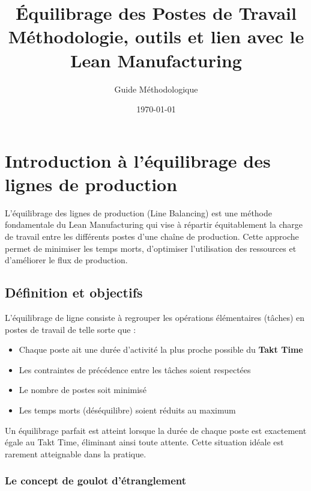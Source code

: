 \documentclass[12pt,a4paper]{article}
\title{\Huge\textbf{Équilibrage des Postes de Travail} \\
        \Large Méthodologie, outils et lien avec le Lean Manufacturing}
\author{Guide Méthodologique}
\date{\today}
\newenvironment{importantnote}
  {\begin{tcolorbox}[colback=blue!5!white, colframe=blue!50!black, title=\textbf{Point Important}]\small}
  {\end{tcolorbox}}
\begin{document}
\maketitle
\tableofcontents
\newpage


\section{Introduction à l'équilibrage des lignes de production}

L'équilibrage des lignes de production (Line Balancing) est une méthode fondamentale du Lean Manufacturing qui vise à répartir équitablement la charge de travail entre les différents postes d'une chaîne de production. Cette approche permet de minimiser les temps morts, d'optimiser l'utilisation des ressources et d'améliorer le flux de production.

\subsection{Définition et objectifs}

L'équilibrage de ligne consiste à regrouper les opérations élémentaires (tâches) en postes de travail de telle sorte que :

\begin{itemize}
    \item Chaque poste ait une durée d'activité la plus proche possible du \textbf{Takt Time}
    \item Les contraintes de précédence entre les tâches soient respectées
    \item Le nombre de postes soit minimisé
    \item Les temps morts (déséquilibre) soient réduits au maximum
\end{itemize}

\begin{importantnote}
Un équilibrage parfait est atteint lorsque la durée de chaque poste est exactement égale au Takt Time, éliminant ainsi toute attente. Cette situation idéale est rarement atteignable dans la pratique.
\end{importantnote}

\subsubsection{Le concept de goulot d'étranglement}
\end{document}
